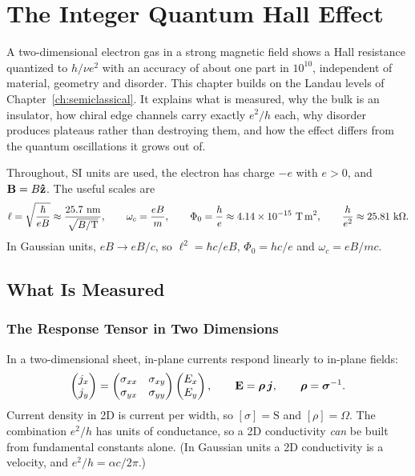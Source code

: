 \chapter{The Integer Quantum Hall Effect}
\label{ch:qhe}

A two-dimensional electron gas in a strong magnetic field shows a Hall resistance quantized to $h/\nu e^2$ with an accuracy of about one part in $10^{10}$, independent of material, geometry and disorder. This chapter builds on the Landau levels of Chapter~\ref{ch:semiclassical}. It explains what is measured, why the bulk is an insulator, how chiral edge channels carry exactly $e^2/h$ each, why disorder produces plateaus rather than destroying them, and how the effect differs from the quantum oscillations it grows out of.

Throughout, SI units are used, the electron has charge $-e$ with $e>0$, and $\cvect{B} = B\uvect{z}$. The useful scales are
\[
    \ell = \sqrt{\frac{\hbar}{eB}} \approx \frac{25.7\ \text{nm}}{\sqrt{B/\text{T}}},
    \qquad
    \omega_c = \frac{eB}{m},
    \qquad
    \Phi_0 = \frac{h}{e} \approx 4.14\times10^{-15}\ \text{T\,m}^2,
    \qquad
    \frac{h}{e^2} \approx 25.81\ \text{k}\Omega.
\]
In Gaussian units, $eB\to eB/c$, so $\ell^2 = \hbar c/eB$, $\Phi_0 = hc/e$ and $\omega_c = eB/mc$.

\section{What Is Measured}

\subsection{The Response Tensor in Two Dimensions}

In a two-dimensional sheet, in-plane currents respond linearly to in-plane fields:
\begin{equation}
    \begin{pmatrix} j_x\\ j_y\end{pmatrix} =
    \begin{pmatrix}\sigma_{xx} & \sigma_{xy}\\ \sigma_{yx} & \sigma_{yy}\end{pmatrix}
    \begin{pmatrix} E_x\\ E_y\end{pmatrix},
    \qquad
    \cvect{E} = \bm{\rho}\,\lvect{j},
    \qquad
    \bm{\rho} = \bm{\sigma}^{-1}.
\end{equation}
Current density in 2D is current per width, so $[\sigma] = \text{S}$ and $[\rho] = \Omega$. The combination $e^2/h$ has units of conductance, so a 2D conductivity \emph{can} be built from fundamental constants alone. (In Gaussian units a 2D conductivity is a velocity, and $e^2/h = \alpha c/2\pi$.)

